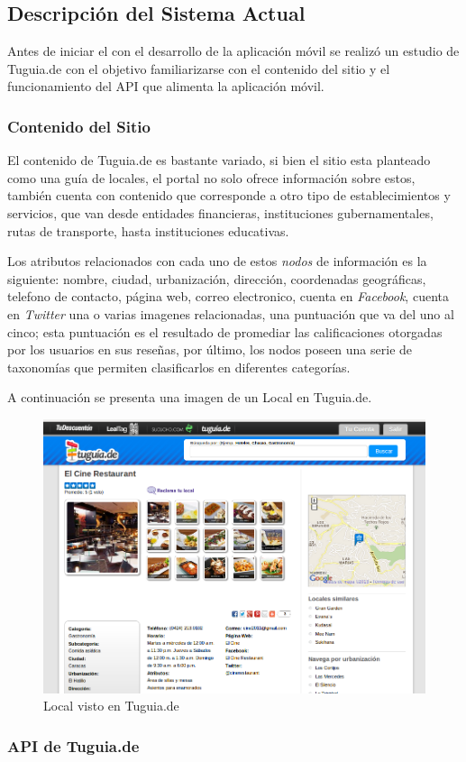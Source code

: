 \subsection{Descripción del Sistema Actual} \label{subsect:descripcion}

Antes de iniciar el con el desarrollo de la aplicación móvil se realizó un estudio de Tuguia.de con el objetivo familiarizarse con el contenido del sitio y el funcionamiento del API que alimenta la aplicación móvil.

\subsubsection{Contenido del Sitio}
El contenido de Tuguia.de es bastante variado, si bien el sitio esta planteado como una guía de locales, el portal no solo ofrece información sobre estos, también cuenta con contenido que corresponde a otro tipo de establecimientos y servicios, que van desde entidades financieras, instituciones gubernamentales, rutas de transporte, hasta  instituciones educativas. 

Los atributos relacionados con cada uno de estos \textit{nodos} de información es la siguiente: nombre, ciudad, urbanización, dirección, coordenadas geográficas, telefono de contacto, página web, correo electronico, cuenta en \textit{Facebook}, cuenta en \textit{Twitter} una o varias imagenes relacionadas, una puntuación que va del uno al cinco; esta puntuación es el resultado de promediar las calificaciones otorgadas por los usuarios en sus reseñas, por último, los nodos poseen una serie de taxonomías que permiten clasificarlos en diferentes categorías. 

A continuación se presenta una imagen de un Local en Tuguia.de.

\begin{figure}[h]
	\begin{center}
		\includegraphics[scale=0.4]{imagenes/local_tgd.png}
	\end{center}
	\caption{
		\label{fig:localtgd}
		Local visto en Tuguia.de \cite{CTGD}
	}
\end{figure}

\subsubsection{API de Tuguia.de}